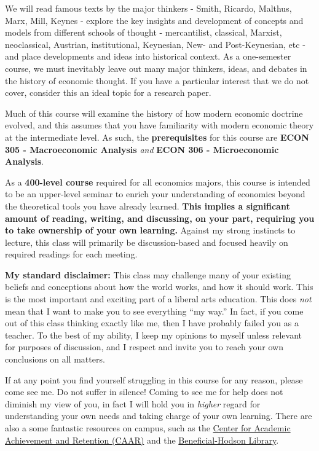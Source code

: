 \documentclass{article}
\begin{document}
We will read famous texts by the major thinkers - Smith, Ricardo,
Malthus, Marx, Mill, Keynes - explore the key insights and development
of concepts and models from different schools of thought - mercantilist,
classical, Marxist, neoclassical, Austrian, institutional, Keynesian,
New- and Post-Keynesian, etc - and place developments and ideas into
historical context. As a one-semester course, we must inevitably leave
out many major thinkers, ideas, and debates in the history of economic
thought. If you have a particular interest that we do not cover,
consider this an ideal topic for a research paper.

Much of this course will examine the history of how modern economic
doctrine evolved, and this assumes that you have familiarity with modern
economic theory at the intermediate level. As such, the
\textbf{prerequisites} for this course are \textbf{ECON 305 -
Macroeconomic Analysis} \emph{and} \textbf{ECON 306 - Microeconomic
Analysis}.

As a \textbf{400-level course} required for all economics majors, this
course is intended to be an upper-level seminar to enrich your
understanding of economics beyond the theoretical tools you have already
learned. \textbf{This implies a significant amount of reading, writing,
and discussing, on your part, requiring you to take ownership of your
own learning.} Against my strong instincts to lecture, this class will
primarily be discussion-based and focused heavily on required readings
for each meeting.

\textbf{My standard disclaimer:} This class may challenge many of your
existing beliefs and conceptions about how the world works, and how it
should work. This is the most important and exciting part of a liberal
arts education. This does \emph{not} mean that I want to make you to see
everything ``my way.'' In fact, if you come out of this class thinking
exactly like me, then I have probably failed you as a teacher. To the
best of my ability, I keep my opinions to myself unless relevant for
purposes of discussion, and I respect and invite you to reach your own
conclusions on all matters.

If at any point you find yourself struggling in this course for any
reason, please come see me. Do not suffer in silence! Coming to see me
for help does not diminish my view of you, in fact I will hold you in
\emph{higher} regard for understanding your own needs and taking charge
of your own learning. There are also a some fantastic resources on
campus, such as the
\href{http://www.hood.edu/campus-services/academic-services/index.html}{Center
for Academic Achievement and Retention (CAAR)} and the
\href{http://www.hood.edu/library/}{Beneficial-Hodson Library}.
\end{document}
